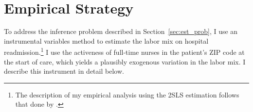 \documentclass[final,12pt]{article}
\begin{document}


\section{Empirical Strategy} \label{sec:emp_str}



To address the inference problem described in Section~\ref{sec:est_prob}, I use an instrumental variables method to estimate the labor mix on hospital readmission.\footnote{The description of my empirical analysis using the 2SLS estimation follows that done by \citet{DoyleJr2015}.}
I use the activeness of full-time nurses in the patient's ZIP code at the start of care, which yields a plausibly exogenous variation in the labor mix.
I describe this instrument in detail below.
\end{document}
